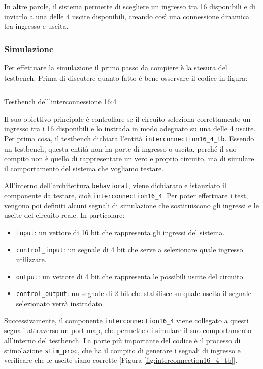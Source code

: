 In altre parole, il sistema permette di scegliere un ingresso tra 16 disponibili e di inviarlo a una delle 4 uscite disponibili, creando così una connessione dinamica tra ingresso e uscita.

\subsubsection{Simulazione}
Per effettuare la simulazione il primo passo da compiere è la stesura del testbench. Prima di discutere quanto fatto è bene osservare il codice in figura:

\begin{code}
    \inputminted{vhdl}{vhdl/interconnection16_4_tb.vhd}
    \caption{Testbench dell'interconnessione 16:4}
    \label{cod:interconnection16_4_tb}
\end{code}

Il suo obiettivo principale è controllare se il circuito seleziona correttamente un ingresso tra i 16 disponibili e lo instrada in modo adeguato su una delle 4 uscite. Per prima cosa, il testbench dichiara l’entità \texttt{interconnection16\_4\_tb}. Essendo un testbench, questa entità non ha porte di ingresso o uscita, perché il suo compito non è quello di rappresentare un vero e proprio circuito, ma di simulare il comportamento del sistema che vogliamo testare.

All’interno dell’architettura \texttt{behavioral}, viene dichiarato e istanziato il componente da testare, cioè \texttt{interconnection16\_4}. Per poter effettuare i test, vengono poi definiti alcuni segnali di simulazione che sostituiscono gli ingressi e le uscite del circuito reale. In particolare:

\begin{itemize}
    \item \texttt{input}: un vettore di 16 bit che rappresenta gli ingressi del sistema.
    \item \texttt{control\_input}: un segnale di 4 bit che serve a selezionare quale ingresso utilizzare.
    \item \texttt{output}: un vettore di 4 bit che rappresenta le possibili uscite del circuito.
    \item \texttt{control\_output}: un segnale di 2 bit che stabilisce su quale uscita il segnale selezionato verrà instradato.
\end{itemize}

Successivamente, il componente \texttt{interconnection16\_4} viene collegato a questi segnali attraverso un port map, che permette di simulare il suo comportamento all’interno del testbench. La parte più importante del codice è il processo di stimolazione \texttt{stim\_proc}, che ha il compito di generare i segnali di ingresso e verificare che le uscite siano corrette [Figura \ref{fig:interconnection16_4_tb}].

